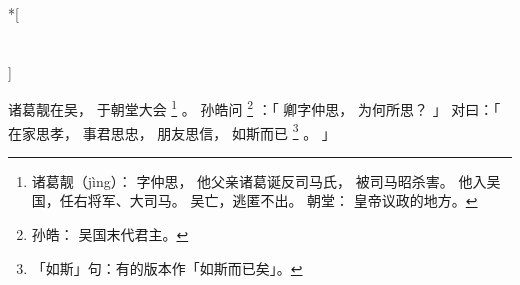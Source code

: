 
\switchcolumn[0]*[\section{}]

诸葛靓在吴，
于朝堂大会%
\footnote{%
    诸葛靓（jìng）：
        字仲思，
        他父亲诸葛诞反司马氏，
        被司马昭杀害。
        他入吴国，任右将军、大司马。
        吴亡，逃匿不出。
    朝堂：
        皇帝议政的地方。
}%
。
孙皓问%
\footnote{%
    孙皓：
        吴国末代君主。
}%
：「
    卿字仲思，
    为何所思？
」
对曰：「
    在家思孝，
    事君思忠，
    朋友思信，
    如斯而已%
    \footnote{%
        「如斯」句：有的版本作「如斯而已矣」。
    }%
    。
」

\switchcolumn



